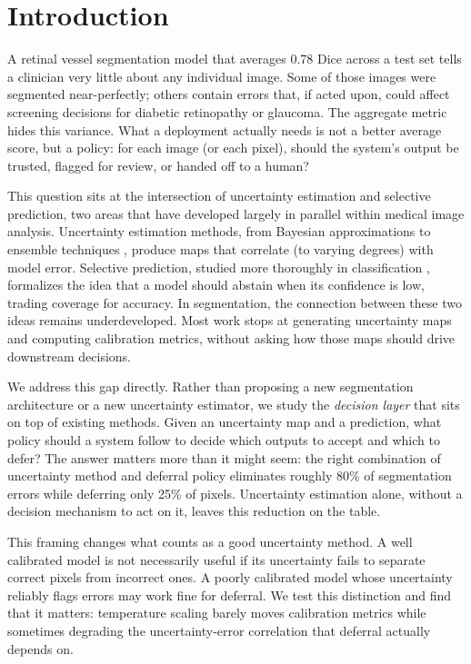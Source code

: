 \section{Introduction}
\label{sec:introduction}

A retinal vessel segmentation model that averages 0.78 Dice across a test set
tells a clinician very little about any individual image. Some of those images
were segmented near-perfectly; others contain errors that, if acted upon, could
affect screening decisions for diabetic retinopathy or glaucoma. The aggregate
metric hides this variance. What a deployment actually needs is not a better
average score, but a policy: for each image (or each pixel), should the system's
output be trusted, flagged for review, or handed off to a human?

This question sits at the intersection of uncertainty estimation and selective
prediction, two areas that have developed largely in parallel within medical
image analysis. Uncertainty estimation methods, from Bayesian approximations
\citep{gal2016dropout} to ensemble techniques \citep{lakshminarayanan2017simple},
produce maps that correlate (to varying degrees) with model error. Selective
prediction, studied more thoroughly in classification
\citep{geifman2017selective,el2010foundations}, formalizes the idea that a model
should abstain when its confidence is low, trading coverage for accuracy.
In segmentation, the connection between these two ideas remains
underdeveloped. Most work stops at generating uncertainty maps and computing
calibration metrics, without asking how those maps should drive downstream
decisions.

We address this gap directly. Rather than proposing a new segmentation
architecture or a new uncertainty estimator, we study the \emph{decision layer}
that sits on top of existing methods. Given an uncertainty map and a prediction,
what policy should a system follow to decide which outputs to accept and which
to defer? The answer matters more than it might seem: the right combination of
uncertainty method and deferral policy eliminates roughly 80\% of segmentation
errors while deferring only 25\% of pixels. Uncertainty estimation alone,
without a decision mechanism to act on it, leaves this reduction on the table.

This framing changes what counts as a good uncertainty method. A well calibrated
model is not necessarily useful if its uncertainty fails to separate correct
pixels from incorrect ones. A poorly calibrated model whose uncertainty
reliably flags errors may work fine for deferral. We test this distinction
and find that it matters: temperature scaling barely moves calibration metrics
while sometimes degrading the uncertainty-error correlation that deferral
actually depends on.

